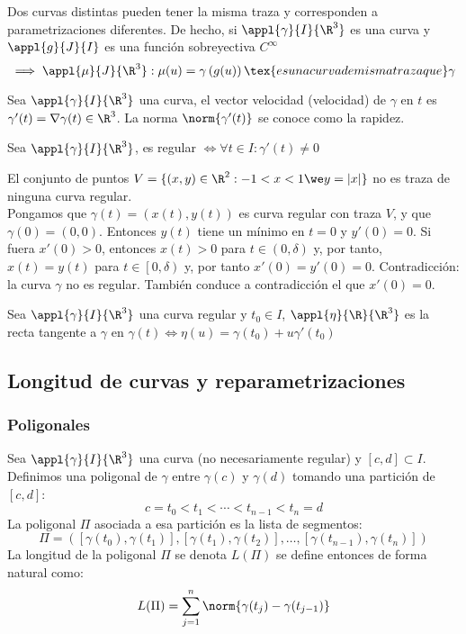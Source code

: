 \documentclass[12pt]{article}
\begin{document}
\begin{obs}
	Dos curvas distintas pueden tener la misma traza y corresponden a parametrizaciones diferentes. De hecho, si $\appl{\gamma}{I}{\R^3}$ es una curva y $\appl{g}{J}{I}$ es una función sobreyectiva $C^{\infty}$
	\[\implies \appl{\mu}{J}{\R^3} : \mu(u)=\gamma\left(g(u)\right)\tex{ es una curva de misma traza que } \gamma\]
\end{obs}
\begin{defn}
	Sea $\appl{\gamma}{I}{\R^3}$ una curva, el vector velocidad (velocidad) de $\gamma$ en $t$ es $\gamma'(t)=\nabla\gamma(t)\in \R^3$. La norma $\norm{\gamma'(t)}$ se conoce como la rapidez.
\end{defn}
\begin{defn}
	Sea $\appl{\gamma}{I}{\R^3}$, es regular $\iff \forall t \in I : \gamma'(t)\ne 0$
\end{defn}
\begin{ejem}
	El conjunto de puntos $V=\{(x, y)\in \R^2:-1<x<1\we y=|x|\}$ no es traza de ninguna curva regular.\\
	\indent Pongamos que $\gamma(t)=(x(t), y(t))$ es curva regular con traza $V$, y que $\gamma(0)=(0,0)$. Entonces $y(t)$ tiene un mínimo en $t = 0$ y $y'(0) = 0$. Si fuera $x'(0) > 0$, entonces $x(t) > 0$ para $t \in (0, \delta)$ y, por tanto, $x(t) =y(t)$ para $t \in \left[0, \delta\right)$ y, por tanto $x'(0) = y'(0) = 0$. Contradicción: la curva $\gamma$ no es regular. También conduce a contradicción el que $x'(0) = 0$.
\end{ejem}
\begin{defn}
	Sea $\appl{\gamma}{I}{\R^3}$ una curva regular y $t_0\in I$, $\appl{\eta}{\R}{\R^3}$ es la recta tangente a $\gamma$ en $\gamma(t) \iff \eta(u)=\gamma(t_0)+u\gamma'(t_0)$
\end{defn}

\subsection{Longitud de curvas y reparametrizaciones}
\subsubsection{Poligonales}
Sea $\appl{\gamma}{I}{\R^3}$ una curva (no necesariamente regular) y $\left[c, d\right] \subset I$. Definimos una poligonal de $\gamma$ entre $\gamma(c)$ y $\gamma(d)$ tomando una partición de $\left[c, d\right]$:
\[c=t_0<t_1<\cdots<t_{n-1}<t_n=d\]
La poligonal $\Pi$ asociada a esa partición es la lista de segmentos:
\[\Pi=\left(\left[\gamma(t_0), \gamma(t_1)\right], \left[\gamma(t_1), \gamma(t_2)\right], \dots, \left[\gamma(t_{n-1}), \gamma(t_n)\right]\right)\]
La longitud de la poligonal $\Pi$ se denota $L(\Pi)$ se define entonces de forma natural como:
\[L(\Pi)=\sum_{j=1}^n \norm{\gamma(t_j)-\gamma(t_{j-1})}\]
\end{document}
